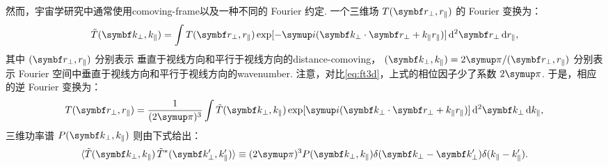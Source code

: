 然而，宇宙学研究中通常使用\ac{comoving-frame}以及一种不同的 Fourier 约定.
一个三维场 $T(\B{r}_{\bot}, r_{\parallel})$ 的 Fourier 变换为：
\begin{equation}
  \label{eq:ft3d-k}
  \tilde{T}(\B{k}_{\bot}, k_{\parallel}) =
    \int T(\B{r}_{\bot}, r_{\parallel})
    \exp[ -\Ci (\B{k}_{\bot} \cdot \B{r}_{\bot}
      + k_{\parallel} r_{\parallel}) ]
    \,\mathrm{d}^2\B{r}_{\bot} \,\D{r}_{\parallel} ,
\end{equation}
其中 $(\B{r}_{\bot}, r_{\parallel})$ 分别表示
垂直于视线方向和平行于视线方向的\acl{distance-comoving}，
$(\B{k}_{\bot}, k_{\parallel}) = 2\Cpi / (\B{r}_{\bot}, r_{\parallel})$
分别表示 Fourier 空间中垂直于视线方向和平行于视线方向的\ac{wavenumber}.
注意，对比\autoref{eq:ft3d}，上式的相位因子少了系数 $2\Cpi$.
于是，相应的逆 Fourier 变换为：
\begin{equation}
  T(\B{r}_{\bot}, r_{\parallel}) =
    \frac{1}{(2\Cpi)^3} \int \tilde{T}(\B{k}_{\bot}, k_{\parallel})
    \exp[ \Ci (\B{k}_{\bot} \cdot \B{r}_{\bot}
      + k_{\parallel} r_{\parallel}) ]
    \,\mathrm{d}^2\B{k}_{\bot} \,\D{k}_{\parallel} ,
\end{equation}
三维功率谱 $P(\B{k}_{\bot}, k_{\parallel})$ 则由下式给出：
\begin{equation}
  \label{eq:ps3d-k}
  \langle \tilde{T}(\B{k}_{\bot}, k_{\parallel})
      \, \tilde{T}^*(\B{k}'_{\bot}, k'_{\parallel}) \rangle
    \equiv (2\Cpi)^3 P(\B{k}_{\bot}, k_{\parallel})
      \delta(\B{k}_{\bot} - \B{k}'_{\bot})
      \delta(k_{\parallel} - k'_{\parallel}) .
\end{equation}

